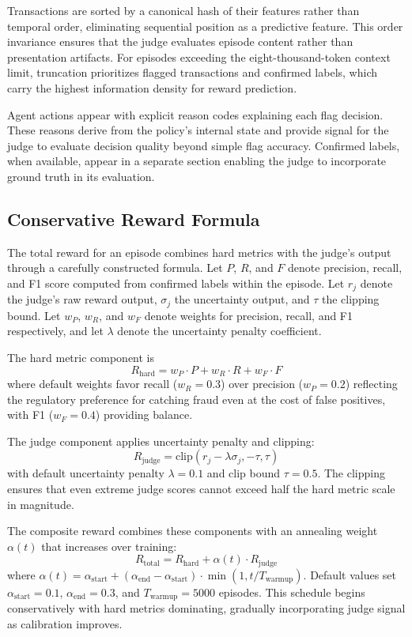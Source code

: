 \documentclass[11pt,a4paper]{article}
\newcommand{\Rtotal}{R_{\text{total}}}
\newcommand{\Rhard}{R_{\text{hard}}}
\newcommand{\Rjudge}{R_{\text{judge}}}
\begin{document}
Transactions are sorted by a canonical hash of their features rather than temporal order, eliminating sequential position as a predictive feature. This order invariance ensures that the judge evaluates episode content rather than presentation artifacts. For episodes exceeding the eight-thousand-token context limit, truncation prioritizes flagged transactions and confirmed labels, which carry the highest information density for reward prediction.

Agent actions appear with explicit reason codes explaining each flag decision. These reasons derive from the policy's internal state and provide signal for the judge to evaluate decision quality beyond simple flag accuracy. Confirmed labels, when available, appear in a separate section enabling the judge to incorporate ground truth in its evaluation.

\subsection{Conservative Reward Formula}

The total reward for an episode combines hard metrics with the judge's output through a carefully constructed formula. Let $P$, $R$, and $F$ denote precision, recall, and F1 score computed from confirmed labels within the episode. Let $r_j$ denote the judge's raw reward output, $\sigma_j$ the uncertainty output, and $\tau$ the clipping bound. Let $w_P$, $w_R$, and $w_F$ denote weights for precision, recall, and F1 respectively, and let $\lambda$ denote the uncertainty penalty coefficient.

The hard metric component is
\[
\Rhard = w_P \cdot P + w_R \cdot R + w_F \cdot F
\]
where default weights favor recall ($w_R = 0.3$) over precision ($w_P = 0.2$) reflecting the regulatory preference for catching fraud even at the cost of false positives, with F1 ($w_F = 0.4$) providing balance.

The judge component applies uncertainty penalty and clipping:
\[
\Rjudge = \text{clip}(r_j - \lambda \sigma_j, -\tau, \tau)
\]
with default uncertainty penalty $\lambda = 0.1$ and clip bound $\tau = 0.5$. The clipping ensures that even extreme judge scores cannot exceed half the hard metric scale in magnitude.

The composite reward combines these components with an annealing weight $\alpha(t)$ that increases over training:
\[
\Rtotal = \Rhard + \alpha(t) \cdot \Rjudge
\]
where $\alpha(t) = \alpha_{\text{start}} + (\alpha_{\text{end}} - \alpha_{\text{start}}) \cdot \min(1, t / T_{\text{warmup}})$. Default values set $\alpha_{\text{start}} = 0.1$, $\alpha_{\text{end}} = 0.3$, and $T_{\text{warmup}} = 5000$ episodes. This schedule begins conservatively with hard metrics dominating, gradually incorporating judge signal as calibration improves.
\end{document}
